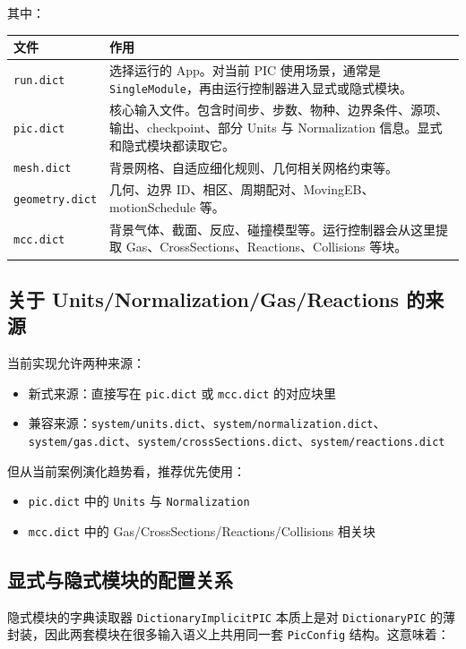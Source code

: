 \documentclass[11pt,a4paper]{ctexart}
\newcommand{\code}[1]{\texttt{#1}}
\newcommand{\file}[1]{\texttt{#1}}
\begin{document}
其中：

\begin{longtable}{p{}p{}}
\toprule
文件 & 作用 \\
\midrule
\endhead
\file{run.dict} & 选择运行的 App。对当前 PIC 使用场景，通常是 \code{SingleModule}，再由运行控制器进入显式或隐式模块。 \\
\file{pic.dict} & 核心输入文件。包含时间步、步数、物种、边界条件、源项、输出、checkpoint、部分 Units 与 Normalization 信息。显式和隐式模块都读取它。 \\
\file{mesh.dict} & 背景网格、自适应细化规则、几何相关网格约束等。 \\
\file{geometry.dict} & 几何、边界 ID、相区、周期配对、MovingEB、motionSchedule 等。 \\
\file{mcc.dict} & 背景气体、截面、反应、碰撞模型等。运行控制器会从这里提取 Gas、CrossSections、Reactions、Collisions 等块。 \\
\bottomrule
\end{longtable}

\subsection{关于 Units/Normalization/Gas/Reactions 的来源}

当前实现允许两种来源：

\begin{itemize}
  \item 新式来源：直接写在 \file{pic.dict} 或 \file{mcc.dict} 的对应块里
  \item 兼容来源：\file{system/units.dict}、\file{system/normalization.dict}、\file{system/gas.dict}、\file{system/crossSections.dict}、\file{system/reactions.dict}
\end{itemize}

但从当前案例演化趋势看，推荐优先使用：

\begin{itemize}
  \item \code{pic.dict} 中的 \code{Units} 与 \code{Normalization}
  \item \code{mcc.dict} 中的 Gas/CrossSections/Reactions/Collisions 相关块
\end{itemize}

\subsection{显式与隐式模块的配置关系}

隐式模块的字典读取器 \code{DictionaryImplicitPIC} 本质上是对 \code{DictionaryPIC} 的薄封装，因此两套模块在很多输入语义上共用同一套 \code{PicConfig} 结构。这意味着：
\end{document}
